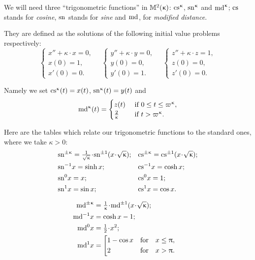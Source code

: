 We will need three ``trigonometric functions'' in $\mathbb{M}_{{}}^{2}({\upkappa})$: $\cs\kappa$, $\sn\kappa$ and $\md\kappa$;
$\mathrm{cs}^{}$ stands for \emph{cosine}, $\mathrm{sn}^{}$ stands for \emph{sine} and $\mathrm{md}^{}$, for \emph{modified distance}. 

They are defined as the solutions of the following initial value problems respectively:
\[
\begin{cases}
 x''+\kappa\cdot x=0,\\
 x(0)=1,\\
 x'(0)=0.
 \end{cases} 
  \quad 
 \begin{cases}
 y''+\kappa\cdot y=0,\\
 y(0)=0,\\
 y'(0)=1.
 \end{cases} 
\quad
 \begin{cases}
 z''+\kappa\cdot z=1,\\
 z(0)=0,\\
 z'(0)=0.
 \end{cases}  
\]

Namely we set $\mathrm{cs}^{\upkappa}(t)=x(t)$, $\mathrm{sn}^{\upkappa}(t)=y(t)$ and 
\[
\md\kappa(t)=
\begin{cases}
z(t)& \textrm{ if } 0\le t\le \varpi\kappa,
\\
\tfrac{2}{\kappa}& \textrm{ if  } t> \varpi\kappa.
\end{cases}
\]

Here are the tables which relate our trigonometric functions to the standard ones, where 
we take $\kappa>0$:\index{$\md\kappa$}\index{$\sn\kappa$}\index{$\cs\kappa$}
\begin{align*}
&\sn{\pm\kappa}=\tfrac{1}{\sqrt{\kappa}}\cdot \sn{\pm1}({x}\cdot {\sqrt{\kappa}});
&&\cs{\pm\kappa}=\cs{\pm1}({x}\cdot {\sqrt{\kappa}});
\\
&\sn{-1} x=\sinh x;&&\cs{-1} x=\cosh x;\\
&\sn{0} x=x;
&&\cs{0} x=1;\\
&\sn{1} x=\sin x;	&&\cs{1} x= \cos x.
\end{align*}
	
\begin{align*}
\md{\pm\kappa}
&=
\tfrac{1}{\kappa}\cdot \md{\pm1}({x}\cdot {\sqrt{\kappa}});
\\
\md{-1} x&=\cosh x-1;
\\
\md{0} x&=\tfrac{1}{2}\cdot x^2; 
\\
\md{1} x
&=
\left[
\begin{aligned}
&1-\cos x&&\t{for}&&x\le \pi,
\\
&2&&\t{for}&&x >\pi.
\end{aligned}
\right.	&
\end{align*}

